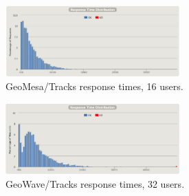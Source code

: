 \begin{figure}[h!tb]
  \centering
  \includegraphics[width=0.60\textwidth]{../docs/img/multitenancy/gm-16-responses.png}
  \caption{GeoMesa/Tracks response times, 16 users.}
  \label{geomesa16}
\end{figure}

\begin{figure}[h!tb]
  \centering
  \includegraphics[width=0.60\textwidth]{../docs/img/multitenancy/gm-32-responses.png}
  \caption{GeoWave/Tracks response times, 32 users.}
  \label{geomesa32}
\end{figure}
